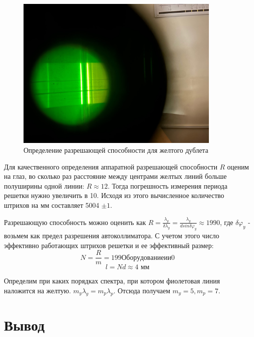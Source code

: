 \begin{figure}[h!]
    \centering
    \includegraphics[width=10cm]{images/getR.jpg}
    \caption{Определение разрешающей способности для желтого дублета}
\end{figure}

Для качественного определения аппаратной разрешающей способности $R$ оценим на глаз, во сколько раз расстояние между центрами желтых линий больше полуширины одной линии: $R \approx 12$. Тогда погрешность измерения периода решетки нужно увеличить в 10. Исходя из этого вычисленное количество штрихов на мм составляет 5004 $\pm 1$.

Разрешающую способность можно оценить как $R = \frac{\lambda_y}{\delta \lambda_y} = \frac{\lambda_y}{d sin\delta\varphi_y} \approx  1990$, где $\delta \varphi_y$ - возьмем как предел разрешения автоколлиматора.
С учетом этого число эффективно работающих штрихов решетки и ее эффективный размер:
\begin{equation}
    N = \frac{R}{m} = 199Оборудование и и0
\end{equation}
\begin{equation}
    l = N d \approx 4 \text{ мм}
\end{equation}

\indent
Определим при каких порядках спектра, при котором фиолетовая линия наложится на желтую. $m_y\lambda_y = m_p\lambda_p$. Отсюда получаем $m_y = 5, m_p = 7$.

\section*{Вывод}

